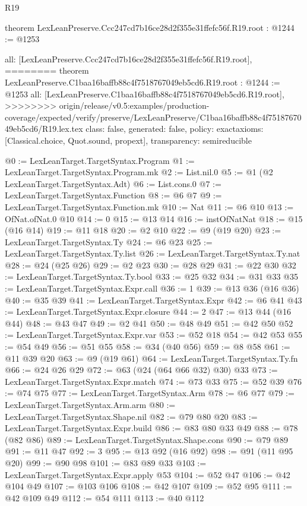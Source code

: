 \begin{lexlean}{R19}
\begin{coremodule}
{{{{{{{{{{{{{theorem LexLeanPreserve.Ccc247cd7b16ce28d2f355e31ffefc56f.R19.root : @1244 := @1253 {
  all: [LexLeanPreserve.Ccc247cd7b16ce28d2f355e31ffefc56f.R19.root],
========
theorem LexLeanPreserve.C1baa16baffb88c4f7518767049eb5cd6.R19.root : @1244 := @1253 {
  all: [LexLeanPreserve.C1baa16baffb88c4f7518767049eb5cd6.R19.root],
>>>>>>>> origin/release/v0.5:examples/production-coverage/expected/verify/preserve/LexLeanPreserve/C1baa16baffb88c4f7518767049eb5cd6/R19.lex.tex
  class: false,
  generated: false,
  policy: exact{axioms: [Classical.choice, Quot.sound, propext]},
  transparency: semireducible
}

@0 := LexLeanTarget.TargetSyntax.Program
@1 := LexLeanTarget.TargetSyntax.Program.mk
@2 := List.nil.{0}
@5 := @1 (@2 LexLeanTarget.TargetSyntax.Adt)
@6 := List.cons.{0}
@7 := LexLeanTarget.TargetSyntax.Function
@8 := @6 @7
@9 := LexLeanTarget.TargetSyntax.Function.mk
@10 := Nat
@11 := @6 @10
@13 := OfNat.ofNat.{0} @10
@14 := 0
@15 := @13 @14
@16 := instOfNatNat
@18 := @15 (@16 @14)
@19 := @11 @18
@20 := @2 @10
@22 := @9 (@19 @20)
@23 := LexLeanTarget.TargetSyntax.Ty
@24 := @6 @23
@25 := LexLeanTarget.TargetSyntax.Ty.list
@26 := LexLeanTarget.TargetSyntax.Ty.nat
@28 := @24 (@25 @26)
@29 := @2 @23
@30 := @28 @29
@31 := @22 @30
@32 := LexLeanTarget.TargetSyntax.Ty.bool
@33 := @25 @32
@34 := @31 @33
@35 := LexLeanTarget.TargetSyntax.Expr.call
@36 := 1
@39 := @13 @36 (@16 @36)
@40 := @35 @39
@41 := LexLeanTarget.TargetSyntax.Expr
@42 := @6 @41
@43 := LexLeanTarget.TargetSyntax.Expr.closure
@44 := 2
@47 := @13 @44 (@16 @44)
@48 := @43 @47
@49 := @2 @41
@50 := @48 @49
@51 := @42 @50
@52 := LexLeanTarget.TargetSyntax.Expr.var
@53 := @52 @18
@54 := @42 @53
@55 := @54 @49
@56 := @51 @55
@58 := @34 (@40 @56)
@59 := @8 @58
@61 := @11 @39 @20
@63 := @9 (@19 @61)
@64 := LexLeanTarget.TargetSyntax.Ty.fn
@66 := @24 @26 @29
@72 := @63 (@24 (@64 @66 @32) @30) @33
@73 := LexLeanTarget.TargetSyntax.Expr.match
@74 := @73 @33
@75 := @52 @39
@76 := @74 @75
@77 := LexLeanTarget.TargetSyntax.Arm
@78 := @6 @77
@79 := LexLeanTarget.TargetSyntax.Arm.arm
@80 := LexLeanTarget.TargetSyntax.Shape.nil
@82 := @79 @80 @20
@83 := LexLeanTarget.TargetSyntax.Expr.build
@86 := @83 @80 @33 @49
@88 := @78 (@82 @86)
@89 := LexLeanTarget.TargetSyntax.Shape.cons
@90 := @79 @89
@91 := @11 @47
@92 := 3
@95 := @13 @92 (@16 @92)
@98 := @91 (@11 @95 @20)
@99 := @90 @98
@101 := @83 @89 @33
@103 := LexLeanTarget.TargetSyntax.Expr.apply @53
@104 := @52 @47
@106 := @42 @104 @49
@107 := @103 @106
@108 := @42 @107
@109 := @52 @95
@111 := @42 @109 @49
@112 := @54 @111
@113 := @40 @112
}}}}}}}}}}}}}}
\end{coremodule}
\end{lexlean}

